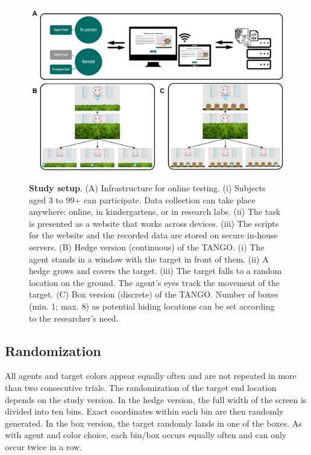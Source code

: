 \documentclass[
  man,floatsintext]{apa6}
\begin{document}
\begin{figure}

{\centering \includegraphics[width=1\linewidth]{../figures/tango_procedure} 

}

\caption{\textbf{Study setup}. (A) Infrastructure for online testing. (i) Subjects aged 3 to 99+ can participate. Data collection can take place anywhere: online, in kindergartens, or in research labs. (ii) The task is presented as a website that works across devices. (iii) The scripts for the website and the recorded data are stored on secure in-house servers. (B) Hedge version (continuous) of the TANGO. (i) The agent stands in a window with the target in front of them. (ii) A hedge grows and covers the target. (iii) The target falls to a random location on the ground. The agent's eyes track the movement of the target. (C) Box version (discrete) of the TANGO. Number of boxes (min. 1; max. 8) as potential hiding locations can be set according to the researcher's need.}\label{fig:fig1}
\end{figure}

\hypertarget{randomization}{%
\subsection{Randomization}\label{randomization}}

All agents and target colors appear equally often and are not repeated in more than two consecutive trials.
The randomization of the target end location depends on the study version.
In the hedge version, the full width of the screen is divided into ten bins.
Exact coordinates within each bin are then randomly generated.
In the box version, the target randomly lands in one of the boxes.
As with agent and color choice, each bin/box occurs equally often and can only occur twice in a row.
\end{document}
